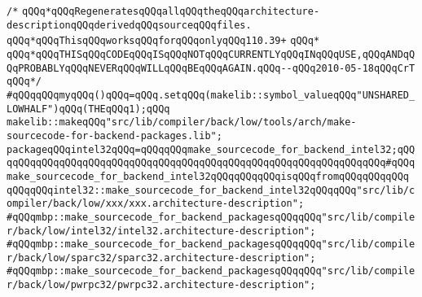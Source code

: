 \label{src/lib/compiler/back/low/make-derived-sourcecode-for-all-backends.pkg}
\verb|/*|\newline
\verb|qQQq*qQQqRegeneratesqQQqallqQQqtheqQQqarchitecture-descriptionqQQqderivedqQQqsourceqQQqfiles.|\newline
\verb|qQQq*qQQqThisqQQqworksqQQqforqQQqonlyqQQq110.39+|\newline
\verb|qQQq*|\newline
\verb|qQQq*qQQqTHISqQQqCODEqQQqISqQQqNOTqQQqCURRENTLYqQQqINqQQqUSE,qQQqANDqQQqPROBABLYqQQqNEVERqQQqWILLqQQqBEqQQqAGAIN.qQQq--qQQq2010-05-18qQQqCrT|\newline
\verb|qQQq*/|\newline
\verb|#qQQqqQQqmyqQQq()qQQq=qQQq.setqQQq(makelib::symbol_valueqQQq"UNSHARED_LOWHALF")qQQq(THEqQQq1);qQQq|\newline
\newline
\newline
\verb|makelib::makeqQQq"src/lib/compiler/back/low/tools/arch/make-sourcecode-for-backend-packages.lib";|\newline
\newline
\verb|packageqQQqintel32qQQq=qQQqqQQqmake_sourcecode_for_backend_intel32;qQQqqQQqqQQqqQQqqQQqqQQqqQQqqQQqqQQqqQQqqQQqqQQqqQQqqQQqqQQqqQQqqQQq#qQQqmake_sourcecode_for_backend_intel32qQQqqQQqqQQqisqQQqfromqQQqqQQqqQQq|\newline
\newline
\newline
\verb|qQQqqQQqintel32::make_sourcecode_for_backend_intel32qQQqqQQq"src/lib/compiler/back/low/xxx/xxx.architecture-description";|\newline
\newline
\verb|#qQQqmbp::make_sourcecode_for_backend_packagesqQQqqQQq"src/lib/compiler/back/low/intel32/intel32.architecture-description";|\newline
\verb|#qQQqmbp::make_sourcecode_for_backend_packagesqQQqqQQq"src/lib/compiler/back/low/sparc32/sparc32.architecture-description";|\newline
\verb|#qQQqmbp::make_sourcecode_for_backend_packagesqQQqqQQq"src/lib/compiler/back/low/pwrpc32/pwrpc32.architecture-description";|\newline

